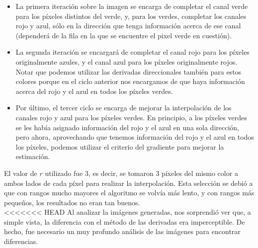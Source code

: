 \documentclass[a4paper]{article}
\begin{document}
\begin{itemize}
\item La primera iteración sobre la imagen se encarga de completar el canal verde para los píxeles distintos del verde, y, para los verdes, completar los canales rojo y azul, sólo en la dirección que tenga información acerca de ese canal (dependerá de la fila en la que se encuentre el pixel verde en cuestión).
\item La segunda iteración se encargará de completar el canal rojo para los píxeles originalmente azules, y el canal azul para los píxeles originalmente rojos. Notar que podemos utilizar las derivadas direccionales también para estos colores porque en el ciclo anterior nos encargamos de que haya información acerca del rojo y el azul en todos los píxeles verdes.
\item Por último, el tercer ciclo se encarga de mejorar la interpolación de los canales rojo y azul para los píxeles verdes. En principio, a los píxeles verdes se les había asignado información del rojo y el azul en una sola dirección, pero ahora, aprovechando que tenemos información del rojo y el azul en todos los píxeles, podemos utilizar el criterio del gradiente para mejorar la estimación.
\end{itemize}

El valor de $r$ utilizado fue 3, es decir, se tomaron 3 píxeles del mismo color a ambos lados de cada píxel para realizar la interpolación. Esta selección se debió a que con rangos mucho mayores el algoritmo se volvía más lento, y con rangos más pequeños, los resultados no eran tan buenos.\\

<<<<<<< HEAD
Al analizar la imágenes generadas, nos sorprendió ver que, a simple vista, la diferencia con el método de las derivadas era imperceptible. De hecho, fue necesario un muy profundo análisis de las imágenes para encontrar diferencias.\\
\end{document}
